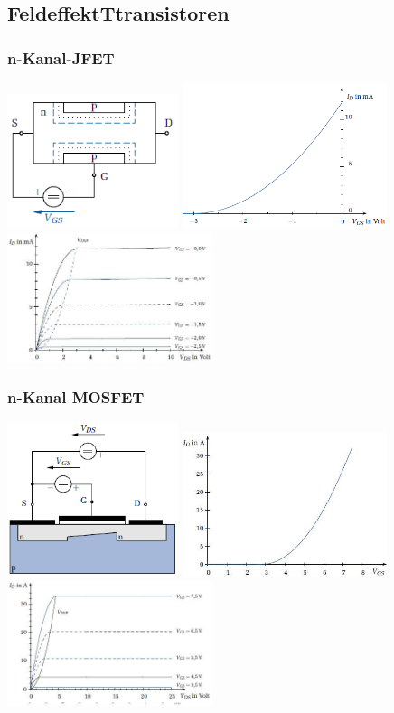 \subsection{FeldeffektTtransistoren}

\subsubsection{n-Kanal-JFET}
\includegraphics[width=5cm]{bilder/jFET}
\includegraphics[width=6cm]{bilder/jFetSteuerKennlinie}
\includegraphics[width=6cm]{bilder/jFetAusgangsKennlinie}\\

\subsubsection{n-Kanal MOSFET}

\includegraphics[width=5cm]{bilder/MOSFET}
\includegraphics[width=6cm]{bilder/MOSFETSteuerKennlinie}
\includegraphics[width=6cm]{bilder/MOSFETAusgangsKennlinie}\\